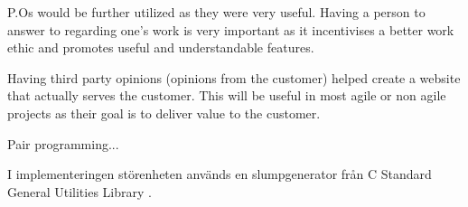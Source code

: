 P.Os would be further utilized as they were very useful. Having a person to answer to regarding one's work is very important as it incentivises a better work ethic and promotes useful and understandable features.

Having third party opinions (opinions from the customer) helped create a website that actually serves the customer. This will be useful in most agile or non agile projects as their goal is to deliver value to the customer.

Pair programming...


I implementeringen störenheten används en slumpgenerator från C Standard General 
Utilities Library . %